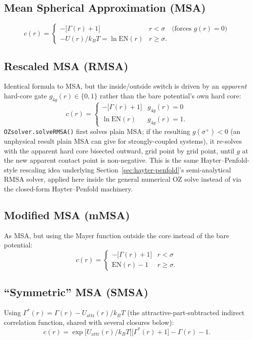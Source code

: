 \documentclass[11pt,a4paper]{article}
\newcommand{\code}[1]{\texttt{#1}}
\begin{document}
\subsection{Mean Spherical Approximation (MSA)}
\begin{equation}
  c(r) = \begin{cases} -\big[\Gamma(r)+1\big] & r<\sigma \quad\text{(forces }g(r){=}0)\\
    -U(r)/k_BT = \ln\mathrm{EN}(r) & r\ge\sigma. \end{cases}
\end{equation}

\subsection{Rescaled MSA (RMSA)}
\label{sec:rmsa-closure}
Identical formula to MSA, but the inside/outside switch is driven by an
\emph{apparent} hard-core gate $g_{4g}(r)\in\{0,1\}$ rather than the bare
potential's own hard core:
\begin{equation}
  c(r) = \begin{cases} -\big[\Gamma(r)+1\big] & g_{4g}(r)=0\\ \ln\mathrm{EN}(r) & g_{4g}(r)=1. \end{cases}
\end{equation}
\code{OZsolver.solveRMSA()} first solves plain MSA; if the resulting
$g(\sigma^+)<0$ (an unphysical result plain MSA can give for strongly-coupled
systems), it re-solves with the apparent hard core bisected outward, grid
point by grid point, until $g$ at the new apparent contact point is
non-negative. This is the same Hayter--Penfold-style rescaling idea underlying
Section~\ref{sec:hayter-penfold}'s semi-analytical RMSA solver, applied here
inside the general numerical OZ solve instead of via the closed-form
Hayter--Penfold machinery.

\subsection{Modified MSA (mMSA)}
As MSA, but using the Mayer function outside the core instead of the bare
potential:
\begin{equation}
  c(r) = \begin{cases} -\big[\Gamma(r)+1\big] & r<\sigma\\ \mathrm{EN}(r)-1 & r\ge\sigma. \end{cases}
\end{equation}

\subsection{``Symmetric'' MSA (SMSA)}
Using $\Gamma^*(r)=\Gamma(r)-U_{\mathrm{attr}}(r)/k_BT$ (the attractive-part-subtracted
indirect correlation function, shared with several closures below):
\begin{equation}
  c(r) = \exp\!\big[U_{\mathrm{attr}}(r)/k_BT\big]\big[\Gamma^*(r)+1\big] - \Gamma(r) - 1.
\end{equation}
\end{document}
